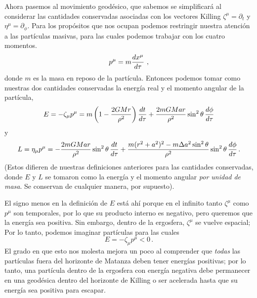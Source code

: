 \documentclass[11pt,b5paper,openany,twoside]{book}
\newcommand{\p}[1]{{\partial_{#1}}}
\begin{document}
Ahora pasemos al movimiento geodésico, que sabemos se simplificará al considerar las cantidades conservadas asociadas con los vectores Killing $\zeta^\mu=\p{t}$ y $\eta^\mu=\p\phi$.
Para los propósitos que nos ocupan podemos restringir nuestra atención a las partículas masivas, para las cuales podemos trabajar con los cuatro momentos.
\begin{equation}
p^\mu = m {{dx^\mu}\over{d\tau}}\ ,\label{7.135}
\end{equation}
donde $m$ es la masa en reposo de la partícula.
Entonces podemos tomar como nuestras dos cantidades conservadas la energía real y el momento angular de la partícula,
\begin{equation}
E=-\zeta_\mu p^\mu = m\left(1-{{2GMr}\over {\rho^2}}\right)
{{dt}\over{d\tau}}
+{{2mGMar}\over{\rho^2}}\sin^2\theta\, {{d\phi}\over{d\tau}}\label{7.136}
\end{equation}
y
\begin{equation}
L=\eta_\mu p^\mu=-{{2mGMar}\over{\rho^2}}\sin^2\theta\, {{dt}\over{d\tau}}
+{{m(r^2+a^2)^2 - m\Delta a^2\sin^2\theta}\over{\rho^2}}\sin^2\theta\,
{{d\phi}\over{d\tau}}\,.\label{7.137}
\end{equation}
(Estos difieren de nuestras definiciones anteriores para las cantidades conservadas, donde $E$ y $L$ se tomaron como la energía y el momento angular {\it por unidad de masa}.
Se conservan de cualquier manera, por supuesto).

El signo menos en la definición de $E$ está ahí porque en el infinito tanto $\zeta^\mu$ como $p^\mu$ son temporales, por lo que su producto interno es negativo, pero queremos que la energía sea positiva.
Sin embargo, dentro de la ergosfera, $\zeta^\mu$ se vuelve espacial; Por lo tanto, podemos imaginar partículas para las cuales
\begin{equation}
E = -\zeta_\mu p^\mu < 0\,.\label{7.138}
\end{equation}
El grado en que esto nos molesta mejora un poco al comprender que \textit{todas} las partículas fuera del horizonte de Matanza deben tener energías positivas; por lo tanto, una partícula dentro de la ergosfera con energía negativa debe permanecer en una geodésica dentro del horizonte de Killing o ser acelerada hasta que su energía sea positiva para escapar.
\end{document}
